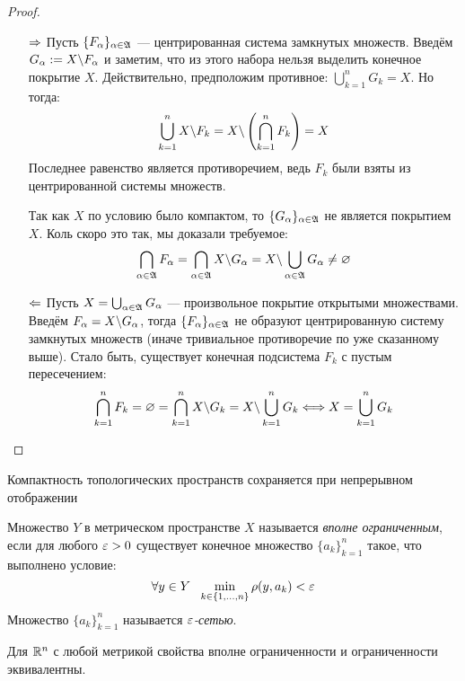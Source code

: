 \begin{proof}~
	\begin{itemize}
		\item[$\Rightarrow$] Пусть $\{F_\alpha\}_{\alpha \in \mathfrak{A}}$ --- центрированная система замкнутых множеств. Введём $G_\alpha := X \backslash F_\alpha$ и заметим, что из этого набора нельзя выделить конечное покрытие $X$. Действительно, предположим противное: $\bigcup_{k = 1}^n G_k = X$. Но тогда:
		\[
			\bigcup_{k = 1}^n X \backslash F_k = X \backslash \left(\bigcap_{k = 1}^n F_k\right) = X
		\]
		Последнее равенство является противоречием, ведь $F_k$ были взяты из центрированной системы множеств.
		
		Так как $X$ по условию было компактом, то $\{G_\alpha\}_{\alpha \in \mathfrak{A}}$ не является покрытием $X$. Коль скоро это так, мы доказали требуемое:
		\[
			\bigcap_{\alpha \in \mathfrak{A}} F_\alpha = \bigcap_{\alpha \in \mathfrak{A}} X \backslash G_\alpha = X \backslash \bigcup_{\alpha \in \mathfrak{A}} G_\alpha \neq \varnothing
		\]
		
		\item[$\Leftarrow$] Пусть $X = \bigcup_{\alpha \in \mathfrak{A}} G_\alpha$ --- произвольное покрытие открытыми множествами. Введём $F_\alpha = X \backslash G_\alpha$, тогда $\{F_\alpha\}_{\alpha \in \mathfrak{A}}$ не образуют центрированную систему замкнутых множеств (иначе тривиальное противоречие по уже сказанному выше). Стало быть, существует конечная подсистема $F_k$ с пустым пересечением:
		\[
			\bigcap_{k = 1}^n F_k = \varnothing = \bigcap_{k = 1}^n X \backslash G_k = X \backslash \bigcup_{k = 1}^n G_k \Longleftrightarrow X = \bigcup_{k = 1}^n G_k
		\]
	\end{itemize}
\end{proof}

\begin{exercise}
	Компактность топологических пространств сохраняется при непрерывном отображении
\end{exercise}

\begin{definition}
	Множество $Y$ в метрическом пространстве $X$ называется \textit{вполне ограниченным}, если для любого $\varepsilon > 0$ существует конечное множество $\{a_k\}_{k = 1}^n$ такое, что выполнено условие:
	\[
		\forall y \in Y\ \ \min_{k \in \{1, \ldots, n\}} \rho(y, a_k) < \varepsilon
	\]
	Множество $\{a_k\}_{k = 1}^n$ называется \textit{$\varepsilon$-сетью}.
\end{definition}

\begin{note}
	Для $\mathbb{R}^n$ с любой метрикой свойства вполне ограниченности и ограниченности эквивалентны.
\end{note}

